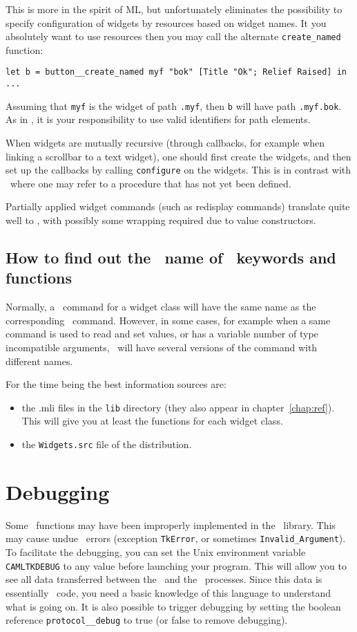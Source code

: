 This is more in the spirit of ML, but unfortunately eliminates the
possibility to specify configuration of widgets by resources based on widget 
names. It you absolutely want to use resources then you may call the
alternate \verb|create_named| function:
\begin{verbatim}
let b = button__create_named myf "bok" [Title "Ok"; Relief Raised] in
...
\end{verbatim} 
Assuming that \verb|myf| is the widget of path \verb|.myf|, then \verb|b|
will have path \verb|.myf.bok|. As in \tk, it is your responsibility to use
valid identifiers for path elements.

When widgets are mutually recursive (through callbacks, for example when
linking a scrollbar to a text widget), one should first create the widgets,
and then set up the callbacks by calling \verb|configure| on the widgets.
This is in contrast with \tcl\tk\ where one may refer to a procedure that
has not yet been defined.

Partially applied widget commands (such as redisplay commands) translate
quite well to \caml, with possibly some wrapping required due to 
value constructors.

\subsection{How to find out the \caml\ name of \tk\ keywords and functions}
Normally, a \caml\ command for a widget class will have the same name as the
corresponding \tk\ command. However, in some cases, for example when a same
command is used to read and set values, or has a variable number of type
incompatible arguments, \camltk\ will have several versions of the command
with different names.

For the time being the best information sources are:
\begin{itemize}
\item  the .mli files in the \verb|lib| directory (they also appear in
chapter~\ref{chap:ref}). This will give you at least the functions for each
widget class. 

\item  the \verb|Widgets.src| file of the distribution. 

\end{itemize} 

\section{Debugging}
Some \tk\ functions may have been improperly
implemented in the \camltk\ library. This may cause undue \tk\ errors
(exception \verb|TkError|, or sometimes \verb|Invalid_Argument|). To
facilitate the debugging, you can set the 
Unix environment variable \verb|CAMLTKDEBUG| to any value before launching
your program. This will allow you to see all
data transferred between the \caml\ and the \tk\ processes. Since this data is
essentially \tcl\tk\ code, you need a basic knowledge of this language to
understand what is going on.
It is also possible to trigger debugging by setting the boolean reference
\verb|protocol__debug| to true (or false to remove debugging).
